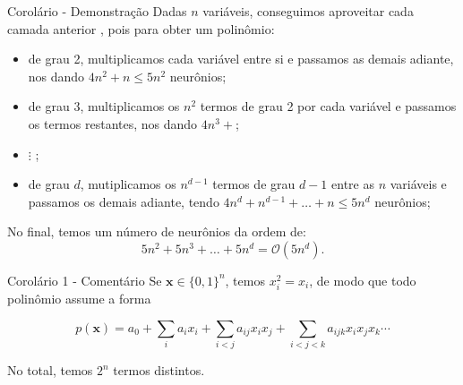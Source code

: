 \documentclass{beamer}
\begin{document}
\begin{frame}{Corolário - Demonstração}
    \small
    Dadas $n$ variáveis, conseguimos aproveitar cada camada anterior , pois para obter um polinômio:
    \begin{itemize}
        \item de grau 2, multiplicamos cada variável entre si e passamos as demais adiante, nos dando $4n^2 + n \leq 5n^2$ neurônios; \pause
        \item de grau 3, multiplicamos os $n^2$ termos de grau 2 por cada variável e passamos os termos restantes, nos dando $4n^3 + $; \pause
        \item $\vdots$ ; 
        \item de grau $d$, mutiplicamos os $n^{d-1}$ termos de grau $d-1$ entre as $n$ variáveis e passamos os demais adiante, tendo $4n^d + n^{d-1}+ \dots + n \leq 5n^d$ neurônios; \pause
    \end{itemize}

    No final, temos um número de neurônios da ordem de:
    \[
        5n^2 + 5n^3 + \dots + 5n^d = \mathcal O (5n^d).
    \]
\end{frame}

\begin{frame}{Corolário 1 - Comentário}
    Se $\mathbf x \in \{0,1\}^n $, temos $x_i^2 = x_i$, de modo que todo polinômio assume a forma

    \begin{equation*}
        p(\mathbf x) = a_0 + \sum_i a_{i} x_i + \sum_{i<j} a_{ij} x_{i}x_{j} + \sum_{i<j<k} a_{ijk} x_{i}x_{j}x_{k} \cdots 
    \end{equation*}

   No total, temos $2^n$ termos distintos.

    \vspace{1em}
\end{frame}
\end{document}
